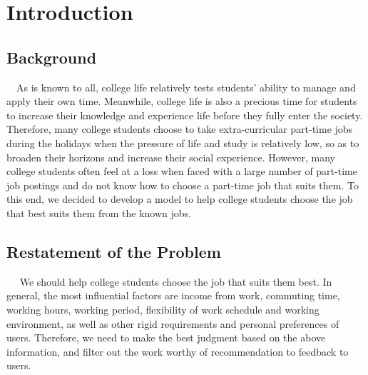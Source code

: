 \documentclass[12pt]{article}
\begin{document}
\pagestyle{fancy}\fancyhf{}\setcounter{page}{1} %
\tableofcontents\thispagestyle{empty}\newpage

\setcounter{page}{1} %
\section{Introduction}
    \subsection{Background}
    ~~As is known to all, college life relatively tests students' ability to manage and apply their own time. Meanwhile, college life is also a precious time for students to increase their knowledge and experience life before they fully enter the society. Therefore, many college students choose to take extra-curricular part-time jobs during the holidays when the pressure of life and study is relatively low, so as to broaden their horizons and increase their social experience. However, many college students often feel at a loss when faced with a large number of part-time job postings and do not know how to choose a part-time job that suits them. To this end, we decided to develop a model to help college students choose the job that best suits them from the known jobs.
    \subsection{Restatement of the Problem}
    ~~
    We should help college students choose the job that suits them best. In general, the most influential factors are income from work, commuting time, working hours, working period, flexibility of work schedule and working environment, as well as other rigid requirements and personal preferences of users. Therefore, we need to make the best judgment based on the above information, and filter out the work worthy of recommendation to feedback to users.
\end{document}
